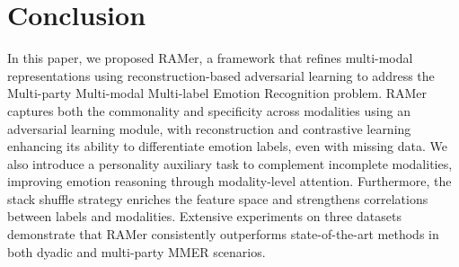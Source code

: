 \vspace{-0.5em}
\section{Conclusion}
In this paper, we proposed {RAMer}, a framework that refines multi-modal representations using reconstruction-based adversarial learning to address the Multi-party Multi-modal Multi-label Emotion Recognition problem. RAMer captures both the commonality and specificity across modalities using an adversarial learning module, with reconstruction and contrastive learning enhancing its ability to differentiate emotion labels, even with missing data. We also introduce a personality auxiliary task to complement incomplete modalities, improving emotion reasoning through modality-level attention. Furthermore, the stack shuffle strategy enriches the feature space and strengthens correlations between labels and modalities.
Extensive experiments on three datasets demonstrate that RAMer consistently outperforms state-of-the-art methods in both dyadic and multi-party MMER scenarios.

